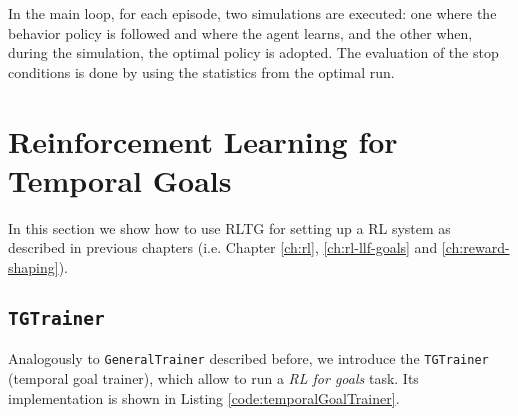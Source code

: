 In the main loop, for each episode, two simulations are executed: one where the behavior policy is followed and where the agent learns, and the other when, during the simulation, the optimal policy is adopted. The evaluation of the stop conditions is done by using the statistics from the optimal run.

\section{Reinforcement Learning for Temporal Goals}
In this section we show how to use RLTG for setting up a RL system as described in previous chapters (i.e. Chapter \ref{ch:rl}, \ref{ch:rl-llf-goals} and \ref{ch:reward-shaping}).

\subsection{\texttt{TGTrainer}}
Analogously to \texttt{GeneralTrainer} described before, we introduce the \texttt{TGTrainer} (temporal goal trainer), which allow to run a \emph{RL for \LLf goals} task. Its implementation is shown in Listing \ref{code:temporalGoalTrainer}.


